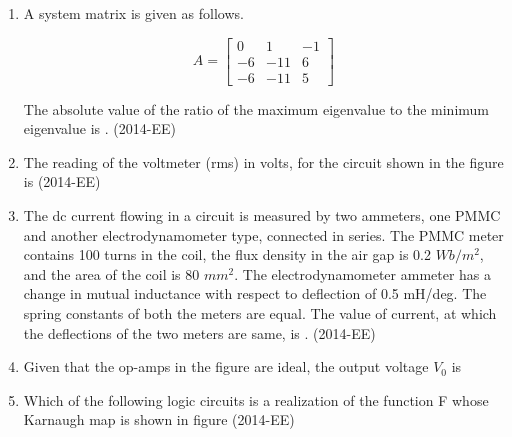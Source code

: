 \documentclass[journal,12pt,twocolumn]{IEEEtran}
\theoremstyle{remark}
\begin{document}
\begin{enumerate}[start=53]
\item A system matrix is given as follows.


$$ A =    \begin{bmatrix}
    0     & 1  & -1 \\
    -6    &  -11 & 6 \\
  -6     &  -11 & 5
\end{bmatrix}$$

The absolute value  of the ratio of the maximum eigenvalue to the minimum eigenvalue is \underline{\hspace{2.5 cm}}.  \hfill{(2014-EE)}

\item The reading of the voltmeter (rms) in volts, for the circuit shown in the figure is \underline{\hspace{2.5 cm}}  \hfill{(2014-EE)}


\begin{center}

\end{center}




\item The dc current flowing in a circuit is measured by two ammeters, one PMMC and another
electrodynamometer type, connected in series. The PMMC meter contains 100 turns in the coil, the
flux density in the air gap is 0.2 $Wb/m^2$, and the area of the coil is 80 $mm^2$. The electrodynamometer
ammeter has a change in mutual inductance with respect to deflection of 0.5 mH/deg. The spring
constants of both the meters are equal. The value of current, at which the deflections of the two
meters are same, is \underline{\hspace{2.5 cm}}.  \hfill{(2014-EE)}
\\

\item Given that the op-amps in the figure are ideal, the output voltage $V_0$ is 
\begin{center}

\end{center}
	\begin{enumerate}
\end{enumerate}
\item Which of the following logic circuits is a realization of the function F whose Karnaugh map is
shown in figure \hfill{(2014-EE)}


\end{enumerate}
\end{document}
